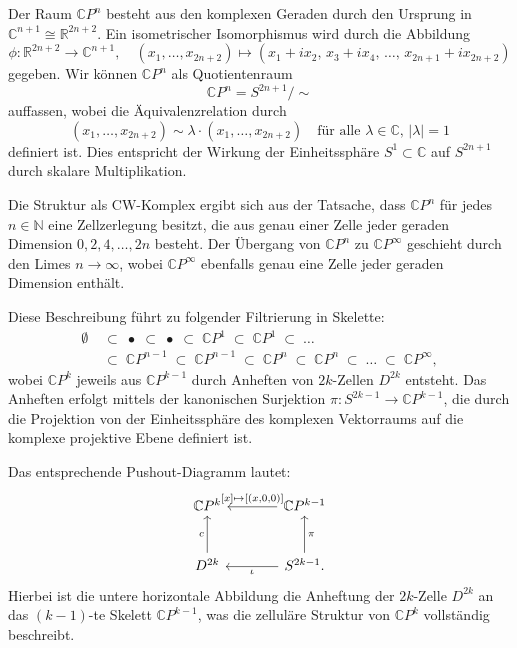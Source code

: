 \documentclass[12pt]{article}
\numberwithin{conj}{section}
\begin{document}
    Der Raum $\mathbb{C}P^{n}$ besteht aus den komplexen Geraden durch den Ursprung
    in $\mathbb{C}^{n+1}\cong \mathbb{R}^{2n+2}$. Ein isometrischer Isomorphismus
    wird durch die Abbildung
    \[
        \phi \colon \mathbb{R}^{2n+2}\to \mathbb{C}^{n+1}, \quad (x_{1}, \dots, x_{2n+2}) \mapsto (x_{1} + i x_{2},\, x_{3} + i x_{4},\, \dots,\, x_{2n+1}+  i x_{2n+2})
    \]
    gegeben. Wir können $\mathbb{C}P^{n}$ als Quotientenraum
    \[
        \mathbb{C}P^{n} = S^{2n+1}/ \sim
    \]
    auffassen, wobei die Äquivalenzrelation durch
    \[
        (x_{1}, \ldots, x_{2n+2}) \sim \lambda \cdot (x_{1}, \ldots, x_{2n+2}) \quad
        \text{für alle }\lambda \in \mathbb{C},\, |\lambda| = 1
    \]
    definiert ist. Dies entspricht der Wirkung der Einheitssphäre $S^{1} \subset \mathbb{C}$
    auf $S^{2n+1}$ durch skalare Multiplikation.

    Die Struktur als CW-Komplex ergibt sich aus der Tatsache, dass
    $\mathbb{C}P^{n}$ für jedes $n \in \mathbb{N}$ eine Zellzerlegung besitzt, die
    aus genau einer Zelle jeder geraden Dimension $0, 2, 4, \dots, 2n$ besteht.
    Der Übergang von $\mathbb{C}P^{n}$ zu $\mathbb{C}P^{\infty}$ geschieht durch
    den Limes $n \to \infty$, wobei $\mathbb{C}P^{\infty}$ ebenfalls genau eine Zelle
    jeder geraden Dimension enthält.

    Diese Beschreibung führt zu folgender Filtrierung in Skelette:
    \begin{align*}
        \emptyset & \;\subset\; \bullet \;\subset\; \bullet \;\subset\; \mathbb{C}P^{1} \;\subset\; \mathbb{C}P^{1} \;\subset\; \dots                                                     \\
                  & \;\subset\; \mathbb{C}P^{n-1}\;\subset\; \mathbb{C}P^{n-1}\;\subset\; \mathbb{C}P^{n} \;\subset\; \mathbb{C}P^{n} \;\subset\; \dots \;\subset\; \mathbb{C}P^{\infty},
    \end{align*}
    wobei $\mathbb{C}P^{k}$ jeweils aus $\mathbb{C}P^{k-1}$ durch Anheften von $2k$-Zellen
    $D^{2k}$ entsteht. Das Anheften erfolgt mittels der kanonischen Surjektion
    $\pi \colon S^{2k-1}\to \mathbb{C}P^{k-1}$, die durch die Projektion von der Einheitssphäre
    des komplexen Vektorraums auf die komplexe projektive Ebene definiert ist.

    Das entsprechende Pushout-Diagramm lautet:
    \[
        \begin{tikzcd}
            [sep=large] {\mathbb{C}P^k} & {\mathbb{C}P^{k-1}} \\ {D^{2k}} & {S^{2k-1}}.
            \arrow["{[x] \mapsto[(x,0,0)]}"', from=1-2, to=1-1] \arrow["c", from=2-1,
            to=1-1] \arrow["\pi"', from=2-2, to=1-2] \arrow["\iota", from=2-2, to=2-1]
        \end{tikzcd}
    \]
    Hierbei ist die untere horizontale Abbildung die Anheftung der $2k$-Zelle
    $D^{2k}$ an das $(k-1)$-te Skelett $\mathbb{C}P^{k-1}$, was die zelluläre Struktur
    von $\mathbb{C}P^{k}$ vollständig beschreibt.
\end{document}
